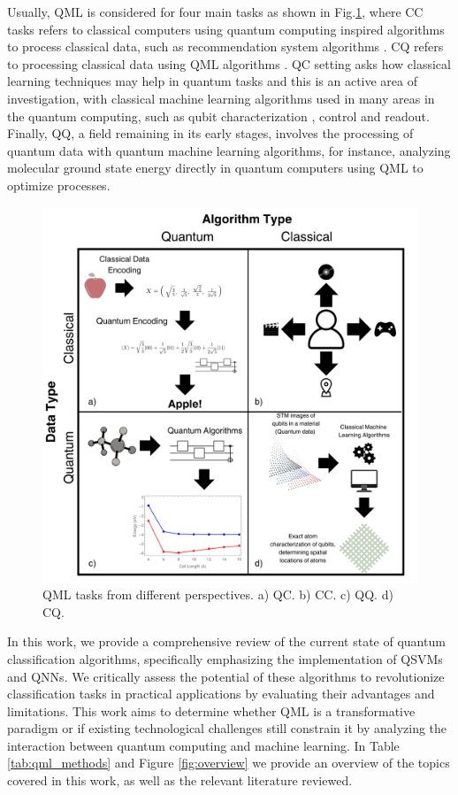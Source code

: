 \documentclass{article}
\begin{document}
Usually, QML is considered for four main tasks as shown in Fig.\ref{fig:qtasks}, where CC tasks refers to classical computers using quantum computing inspired 
algorithms to process classical data, such as recommendation system algorithms \cite{ccalg}. CQ refers to processing classical data using QML algorithms \cite{cq}. 
QC setting asks how classical learning techniques may help in quantum tasks and this is an active area of investigation, with classical machine learning 
algorithms used in many areas in the quantum computing, such as qubit characterization \cite{charqc}, control \cite{controlqc} and readout\cite{readoutqc}. 
Finally, QQ, a field remaining in its early stages, involves the processing of quantum data with quantum machine learning algorithms, 
for instance, analyzing molecular ground state energy directly in quantum computers using QML to optimize processes.

\begin{figure}[h!]
    \centering
    \includegraphics[scale=0.19]{figures/QMLtypes.png}
    \caption{QML tasks from different perspectives. a) QC. b) CC. c) QQ. d) CQ. }
    \label{fig:qtasks}
\end{figure}

In this work, we provide a comprehensive review of the current state of quantum classification algorithms, specifically emphasizing the implementation of QSVMs 
and QNNs. 
We critically assess the potential of these algorithms to revolutionize classification tasks in practical applications by evaluating their advantages and limitations. 
This work aims to determine whether QML is a transformative paradigm or if existing technological challenges still constrain it by analyzing the interaction between 
quantum computing and machine learning. In Table \ref{tab:qml_methods} and Figure \ref{fig:overview} we provide an overview of the topics covered in this work, as well as the relevant literature reviewed. 
\end{document}
